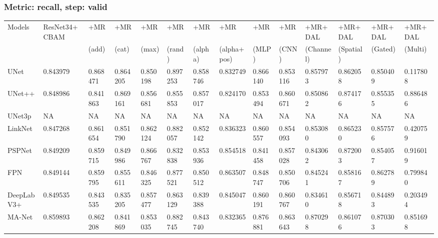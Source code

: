 \documentclass{article}
\begin{document}
\subsubsection{Metric: recall, step: valid}
\begin{tabular}{llllllllllllll}
\toprule
Models & ResNet34+CBAM & +MR  & +MR  & +MR  & +MR  & +MR  & +MR  & +MR  & +MR  & +MR+DAL & +MR+DAL & +MR+DAL & +MR+DAL \\
       &             &  (add) &  (cat) &  (max) &  (rand) &  (alpha) &  (alpha+pos) &  (MLP) &  (CNN) & (Channel) & (Spatial) & (Gated) & (Multi) \\
\midrule
UNet & 0.843979 & 0.868471 & 0.864205 & 0.850198 & 0.897253 & 0.858746 & 0.832749 & 0.866140 & 0.853116 & 0.857973 & 0.862058 & 0.850409 & 0.117808 \\
UNet++ & 0.848986 & 0.841863 & 0.869161 & 0.856681 & 0.855853 & 0.857017 & 0.824170 & 0.853494 & 0.860671 & 0.850862 & 0.874176 & 0.855355 & 0.886486 \\
UNet3p & NA & NA & NA & NA & NA & NA & NA & NA & NA & NA & NA & NA & NA \\
LinkNet & 0.847268 & 0.861654 & 0.851790 & 0.862124 & 0.882057 & 0.852142 & 0.836323 & 0.860557 & 0.854093 & 0.853080 & 0.865230 & 0.857576 & 0.420759 \\
PSPNet & 0.849209 & 0.859715 & 0.849986 & 0.866767 & 0.832838 & 0.853936 & 0.854518 & 0.841458 & 0.857028 & 0.843062 & 0.872003 & 0.854057 & 0.916019 \\
FPN & 0.849144 & 0.859795 & 0.855611 & 0.846325 & 0.877521 & 0.850512 & 0.863507 & 0.848747 & 0.850706 & 0.845241 & 0.858167 & 0.862789 & 0.799840 \\
DeepLabV3+ & 0.849535 & 0.843535 & 0.835205 & 0.857477 & 0.863129 & 0.839388 & 0.845047 & 0.860191 & 0.860767 & 0.834610 & 0.856718 & 0.844893 & 0.203494 \\
MA-Net & 0.859893 & 0.862208 & 0.841869 & 0.853035 & 0.882745 & 0.843740 & 0.832365 & 0.876881 & 0.863643 & 0.870298 & 0.861076 & 0.870303 & 0.851698 \\
\bottomrule
\end{tabular}
\end{document}
